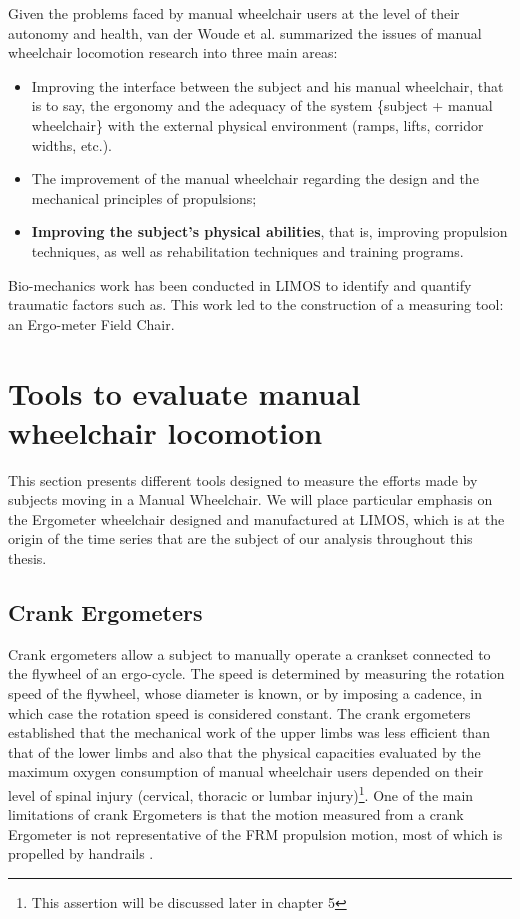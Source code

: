 Given the problems faced by manual wheelchair users at the level of
their autonomy and health, van der Woude et al. \cite{van2005wheelchair, woude1986wheelchair} summarized the issues of manual wheelchair locomotion research into three main areas:

\begin{itemize}
\item Improving the interface between the subject and his manual wheelchair, that is to say, the ergonomy and the adequacy of the system \{subject + manual wheelchair\} with the external physical environment (ramps, lifts, corridor widths, etc.).
\item The improvement of the manual wheelchair regarding the design and the mechanical principles of propulsions;
\item \textbf{Improving the subject's physical abilities}, that is, improving propulsion techniques, as well as rehabilitation techniques and training programs.
\end{itemize}

Bio-mechanics work has been conducted in LIMOS to identify and quantify traumatic factors such as. This work led to the construction of a measuring tool: an Ergo-meter Field Chair.

\section{Tools to evaluate manual wheelchair locomotion}
This section presents different tools designed to measure the efforts made by subjects moving in a Manual Wheelchair. We will place particular emphasis on the Ergometer wheelchair designed and manufactured at LIMOS, which is at the origin of the time series that are the subject of our analysis throughout this thesis.

\subsection{Crank Ergometers}
Crank ergometers allow a subject to manually operate a crankset connected to the flywheel of an ergo-cycle. The speed is determined by measuring the rotation speed of the flywheel, whose diameter is known, or by imposing a cadence, in which case the rotation speed is considered constant. The crank ergometers established that the mechanical work of the upper limbs was less efficient than that of the lower limbs and also that the physical capacities evaluated by the maximum oxygen consumption of manual wheelchair users depended on their level of spinal injury (cervical, thoracic or lumbar injury)\footnote{This assertion will be discussed later in chapter 5}. One of the main limitations of crank Ergometers is that the motion measured from a crank Ergometer is not representative of the FRM propulsion motion, most of which is propelled by handrails \cite{0aastrand1961maximal, bergh1976maximal, stenberg1967hemodynamics}.

